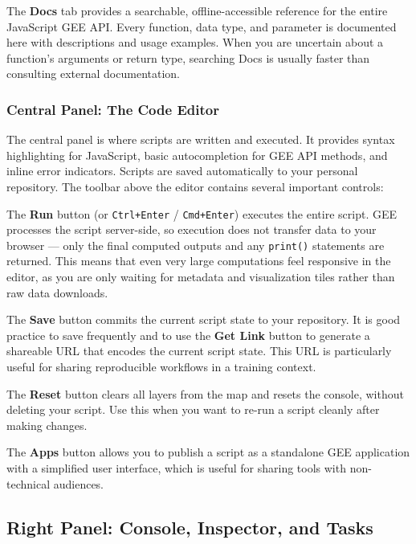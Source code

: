 \documentclass[
  10pt,
  b5paper,
  oneside]{book}
\begin{document}
The \textbf{Docs} tab provides a searchable, offline-accessible reference for the entire JavaScript GEE API. Every function, data type, and parameter is documented here with descriptions and usage examples. When you are uncertain about a function's arguments or return type, searching Docs is usually faster than consulting external documentation.

\subsubsection{Central Panel: The Code Editor}\label{central-panel-the-code-editor}

The central panel is where scripts are written and executed. It provides syntax highlighting for JavaScript, basic autocompletion for GEE API methods, and inline error indicators. Scripts are saved automatically to your personal repository. The toolbar above the editor contains several important controls:

The \textbf{Run} button (or \texttt{Ctrl+Enter} / \texttt{Cmd+Enter}) executes the entire script. GEE processes the script server-side, so execution does not transfer data to your browser --- only the final computed outputs and any \texttt{print()} statements are returned. This means that even very large computations feel responsive in the editor, as you are only waiting for metadata and visualization tiles rather than raw data downloads.

The \textbf{Save} button commits the current script state to your repository. It is good practice to save frequently and to use the \textbf{Get Link} button to generate a shareable URL that encodes the current script state. This URL is particularly useful for sharing reproducible workflows in a training context.

The \textbf{Reset} button clears all layers from the map and resets the console, without deleting your script. Use this when you want to re-run a script cleanly after making changes.

The \textbf{Apps} button allows you to publish a script as a standalone GEE application with a simplified user interface, which is useful for sharing tools with non-technical audiences.

\subsection{Right Panel: Console, Inspector, and Tasks}\label{right-panel-console-inspector-and-tasks}
\end{document}
